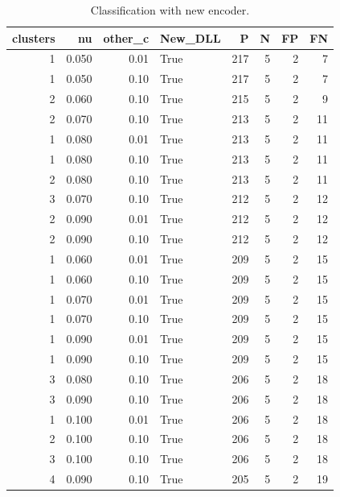 \documentclass[a4paper,twoside,12pt]{book}
\begin{document}
\begin{table}
	\centering
	\caption{Classification with new encoder.}
	\label{id:tab:resEncoder}
	\begin{tabular}{rrrlrrrr}
		\toprule
		 clusters &     nu &  other\_c &  New\_DLL &    P &  N &  FP &  FN \\
		\midrule
				1 &  0.050 &     0.01 &     True &  217 &  5 &   2 &   7 \\
				1 &  0.050 &     0.10 &     True &  217 &  5 &   2 &   7 \\
				2 &  0.060 &     0.10 &     True &  215 &  5 &   2 &   9 \\
				2 &  0.070 &     0.10 &     True &  213 &  5 &   2 &  11 \\
				1 &  0.080 &     0.01 &     True &  213 &  5 &   2 &  11 \\
				1 &  0.080 &     0.10 &     True &  213 &  5 &   2 &  11 \\
				2 &  0.080 &     0.10 &     True &  213 &  5 &   2 &  11 \\
				3 &  0.070 &     0.10 &     True &  212 &  5 &   2 &  12 \\
				2 &  0.090 &     0.01 &     True &  212 &  5 &   2 &  12 \\
				2 &  0.090 &     0.10 &     True &  212 &  5 &   2 &  12 \\
				1 &  0.060 &     0.01 &     True &  209 &  5 &   2 &  15 \\
				1 &  0.060 &     0.10 &     True &  209 &  5 &   2 &  15 \\
				1 &  0.070 &     0.01 &     True &  209 &  5 &   2 &  15 \\
				1 &  0.070 &     0.10 &     True &  209 &  5 &   2 &  15 \\
				1 &  0.090 &     0.01 &     True &  209 &  5 &   2 &  15 \\
				1 &  0.090 &     0.10 &     True &  209 &  5 &   2 &  15 \\
				3 &  0.080 &     0.10 &     True &  206 &  5 &   2 &  18 \\
				3 &  0.090 &     0.10 &     True &  206 &  5 &   2 &  18 \\
				1 &  0.100 &     0.01 &     True &  206 &  5 &   2 &  18 \\
				2 &  0.100 &     0.10 &     True &  206 &  5 &   2 &  18 \\
				3 &  0.100 &     0.10 &     True &  206 &  5 &   2 &  18 \\
				4 &  0.090 &     0.10 &     True &  205 &  5 &   2 &  19 \\

\end{tabular}
\end{table}
\end{document}
